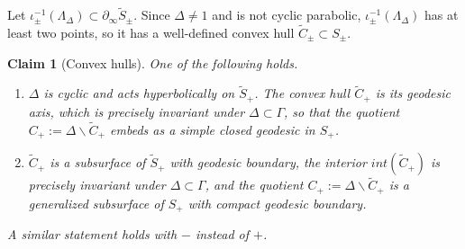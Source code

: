 \documentclass[12pt]{amsart}
\newtheorem{claim}[theorem]{Claim}
\theoremstyle{definition}
\theoremstyle{remark}
\begin{document}
Let $\iota_\pm^{-1}(\Lambda_\Delta) \subset \partial_\infty \tilde S_\pm$. 
Since $\Delta\neq 1$ and is not cyclic parabolic, $\iota_\pm^{-1}(\Lambda_\Delta)$ has at least two points, so it has a well-defined convex hull $\tilde C_\pm \subset S_\pm$.



\begin{claim}[Convex hulls]\label{precise} One of the following holds.
	\begin{enumerate}
		\item $\Delta$ is cyclic and acts hyperbolically on $\tilde S_+$. The convex hull $\tilde C_+$ is its geodesic axis, which is precisely invariant under $\Delta\subset \Gamma$, so that the quotient $C_+:=\Delta \backslash \tilde C_+$ embeds as a simple closed geodesic in $S_+$.
		\item $\tilde C_+$ is a subsurface of $\tilde S_+$ with geodesic boundary, the interior $int(\tilde C_+)$ is precisely invariant under $\Delta\subset \Gamma$, and the quotient $C_+ := \Delta \backslash \tilde C_+$ is a generalized subsurface of $S_+$ with compact geodesic boundary.
	\end{enumerate}
A similar statement holds with $-$ instead of $+$.
\end{claim}
\end{document}
